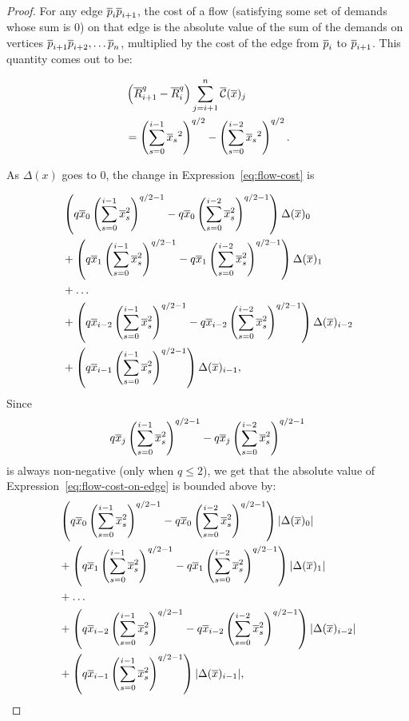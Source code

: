 \begin{proof} For any edge $\overline{p}_i\overline{p}_{i+1}$, the cost of a flow (satisfying
some set of demands whose sum is $0$) on that edge is the absolute value of
the sum of the demands on vertices $\overline{p}_{i+1} \overline{p}_{i+2}, \ldots \overline{p}_n$,
multiplied by the cost of the edge from $\overline{p}_i$ to $\overline{p}_{i+1}$. This
quantity comes out to be:

\begin{align} &\left(\overline{R}_{i+1}^q-\overline{R}_{i}^q \right) \sum_{j=i+1}^n \overline{\mathcal{C}}(\overline{x})_j
\\
\label{eq:flow-cost}
&=\left(\sum_{s=0}^{i-1} {\overline{x}_s}^2\right)^{q/2} -\left(\sum_{s=0}^{i-2}
{\overline{x}_s}^2\right)^{q/2}.
\end{align}

As $\Delta(x)$ goes to $0$, the change in Expression~\ref{eq:flow-cost} is

\begin{align}
\begin{split}
\label{eq:flow-cost-on-edge}
&
\left(q\overline{x}_0 \left(\sum_{s=0}^{i-1} \overline{x}_s^2 \right)^{q/2-1} -
q\overline{x}_0\left(\sum_{s=0}^{i-2} \overline{x}_s^2 \right)^{q/2-1} \right) \Delta(\overline{x})_0
\\
&+
\left(q\overline{x}_1 \left(\sum_{s=0}^{i-1} \overline{x}_s^2 \right)^{q/2-1} -
q\overline{x}_1\left(\sum_{s=0}^{i-2}\overline{x}_s^2 \right)^{q/2-1} \right) \Delta(\overline{x})_1
\\
&+ \ldots
\\
&+
\left(q\overline{x}_{i-2} \left(\sum_{s=0}^{i-1} \overline{x}_s^2 \right)^{q/2-1} -
q\overline{x}_{i-2}\left(\sum_{s=0}^{i-2}\overline{x}_s^2 \right)^{q/2-1}
\right)\Delta(\overline{x})_{i-2}
\\
&+
\left(q\overline{x}_{i-1} \left(\sum_{s=0}^{i-1} \overline{x}_s^2
\right)^{q/2-1}\right)\Delta(\overline{x})_{i-1},
\end{split}
\end{align}
Since 
\[
q\overline{x}_j\left(\sum_{s=0}^{i-1} \overline{x}_s^2\right)^{q/2-1} - q\overline{x}_j\left(\sum_{s=0}^{i-2}
\overline{x}_s^2 \right)^{q/2-1}\]
is always non-negative (only when $q \leq 2$), we get that the absolute value of
Expression~\ref{eq:flow-cost-on-edge} is bounded above by:
\begin{align}
\begin{split}
\label{eq:flow-cost-upper-bound}
&
\left(q\overline{x}_0 \left(\sum_{s=0}^{i-1} \overline{x}_s^2 \right)^{q/2-1} -
q\overline{x}_0\left(\sum_{s=0}^{i-2} \overline{x}_s^2 \right)^{q/2-1} \right)
|\Delta(\overline{x})_0|
\\
&+
\left(q\overline{x}_1 \left(\sum_{s=0}^{i-1} \overline{x}_s^2 \right)^{q/2-1} -
q\overline{x}_1\left(\sum_{s=0}^{i-2}\overline{x}_s^2 \right)^{q/2-1} \right) |\Delta(\overline{x})_1|
\\
&+ \ldots
\\
&+
\left(q\overline{x}_{i-2} \left(\sum_{s=0}^{i-1} \overline{x}_s^2 \right)^{q/2-1} -
q\overline{x}_{i-2}\left(\sum_{s=0}^{i-2}\overline{x}_s^2 \right)^{q/2-1}
\right)|\Delta(\overline{x})_{i-2}|
\\
&+
\left(q\overline{x}_{i-1} \left(\sum_{s=0}^{i-1} \overline{x}_s^2
\right)^{q/2-1}\right)|\Delta(\overline{x})_{i-1}|,
\end{split}
\end{align}


\end{proof}
